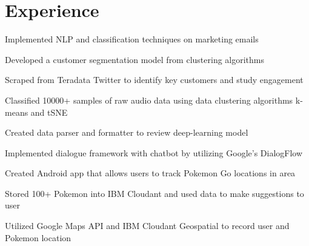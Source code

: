 \documentclass[]{deedy-resume-openfont}
\begin{document}
\hfill
\begin{minipage}[t]{0.66\textwidth} 


\section{Experience}

\sectionsep
\begin{tightemize} 
\item Implemented NLP and classification techniques on marketing emails
\item Developed a customer segmentation model from clustering algorithms
\item Scraped from Teradata Twitter to identify key customers and study engagement
\end{tightemize}
\sectionsep

\begin{tightemize} 
\item Classified 10000+ samples of raw audio data using data clustering algorithms k-means and tSNE
\item Created data parser and formatter to review deep-learning model
\item Implemented dialogue framework with chatbot by utilizing Google's DialogFlow
\end{tightemize}
\sectionsep


\begin{tightemize} 
\item Created Android app that allows users to track Pokemon Go locations in area 
\item Stored 100+ Pokemon into IBM Cloudant and used data to make suggestions to user
\item  Utilized Google Maps API and IBM Cloudant Geospatial to record user and Pokemon location
\end{tightemize}
\sectionsep


\end{minipage}
\end{document}
